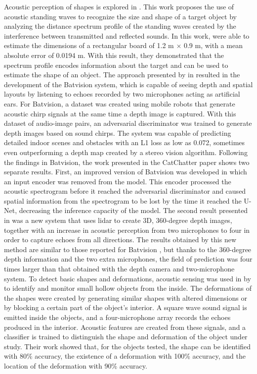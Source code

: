 Acoustic perception of shapes is explored in \cite{shape1}. This work proposes the use of acoustic standing waves to recognize the size and shape of a target object by analyzing the distance spectrum profile of the standing waves created by the interference between transmitted and reflected sounds. In this work, \citeauthor{shape1} were able to estimate the dimensions of a rectangular board of 1.2 m $\times$ 0.9 m, with a mean absolute error of 0.0194 m. With this result, they demonstrated that the spectrum profile encodes information about the target and can be used to estimate the shape of an object. The approach presented by \citeauthor{bat1} in \cite{bat1} resulted in the development of the Batvision system, which is capable of seeing depth and spatial layouts by listening to echoes recorded by two microphones acting as artificial ears. For Batvision, a dataset was created using mobile robots that generate acoustic chirp signals at the same time a depth image is captured. With this dataset of audio-image pairs, an adversarial discriminator was trained to generate depth images based on sound chirps. The system was capable of predicting detailed indoor scenes and obstacles with an L1 loss as low as 0.072, sometimes even outperforming a depth map created by a stereo vision algorithm. Following the findings in Batvision, the work presented in the CatChatter paper \cite{cat1} shows two separate results. First, an improved version of Batvision was developed in which an input encoder was removed from the model. This encoder processed the acoustic spectrogram before it reached the adversarial discriminator and caused spatial information from the spectrogram to be lost by the time it reached the U-Net, decreasing the inference capacity of the model. The second result presented in \cite{cat1} was a new system that uses lidar to create 3D, 360-degree depth images, together with an increase in acoustic perception from two microphones to four in order to capture echoes from all directions. The results obtained by this new method are similar to those reported for Batvision \cite{bat1}, but thanks to the 360-degree depth information and the two extra microphones, the field of prediction was four times larger than that obtained with the depth camera and two-microphone system. To detect basic shapes and deformations, acoustic sensing was used in \cite{echosense} by \citeauthor{echosense} to identify and monitor small hollow objects from the inside. The deformations of the shapes were created by generating similar shapes with altered dimensions or by blocking a certain part of the object's interior. A square wave sound signal is emitted inside the objects, and a four-microphone array records the echoes produced in the interior. Acoustic features are created from these signals, and a classifier is trained to distinguish the shape and deformation of the object under study. Their work showed that, for the objects tested, the shape can be identified with 80\% accuracy, the existence of a deformation with 100\% accuracy, and the location of the deformation with 90\% accuracy.        
